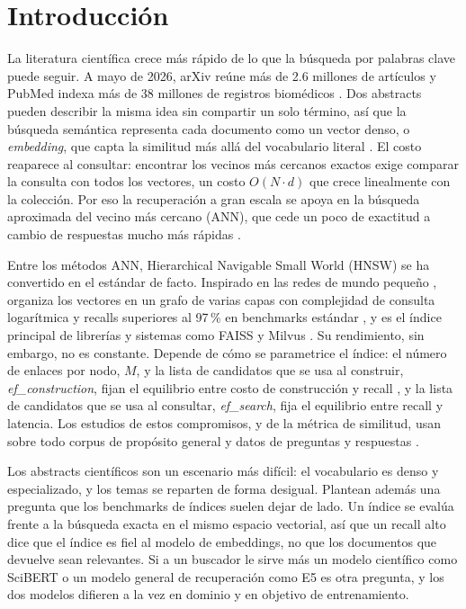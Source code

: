 \documentclass[runningheads]{llncs}
\newcommand{\efc}{\textit{ef\_construction}}
\newcommand{\efs}{\textit{ef\_search}}
\begin{document}
\section{Introducción}

La literatura científica crece más rápido de lo que la búsqueda por palabras clave puede
seguir. A mayo de 2026, arXiv reúne más de 2.6 millones de artículos \cite{ref1} y PubMed
indexa más de 38 millones de registros biomédicos \cite{ref2}. Dos abstracts pueden
describir la misma idea sin compartir un solo término, así que la búsqueda semántica
representa cada documento como un vector denso, o \textit{embedding}, que capta la similitud
más allá del vocabulario literal \cite{ref3}. El costo reaparece al consultar: encontrar los
vecinos más cercanos exactos exige comparar la consulta con todos los vectores, un costo
$O(N \cdot d)$ que crece linealmente con la colección. Por eso la recuperación a gran escala
se apoya en la búsqueda aproximada del vecino más cercano (ANN), que cede un poco de exactitud
a cambio de respuestas mucho más rápidas \cite{ref4}.

Entre los métodos ANN, Hierarchical Navigable Small World (HNSW) \cite{ref5} se ha
convertido en el estándar de facto. Inspirado en las redes de mundo pequeño \cite{ref6},
organiza los vectores en un grafo de varias capas con complejidad de consulta logarítmica y
recalls superiores al 97\,\% en benchmarks estándar \cite{ref5}, y es el índice principal de
librerías y sistemas como FAISS \cite{ref7} y Milvus \cite{ref8}. Su rendimiento, sin
embargo, no es constante. Depende de cómo se parametrice el índice: el número de enlaces por
nodo, $M$, y la lista de candidatos que se usa al construir, \efc{}, fijan el equilibrio entre
costo de construcción y recall \cite{ref9}, y la lista de candidatos que se usa al consultar,
\efs{}, fija el equilibrio entre recall y latencia. Los estudios de estos compromisos, y de la
métrica de similitud, usan sobre todo corpus de propósito general y datos de preguntas y
respuestas \cite{ref11,ref12}.

Los abstracts científicos son un escenario más difícil: el vocabulario es denso y
especializado, y los temas se reparten de forma desigual. Plantean además una pregunta que
los benchmarks de índices suelen dejar de lado. Un índice se evalúa frente a la búsqueda
exacta en el mismo espacio vectorial, así que un recall alto dice que el índice es fiel al
modelo de embeddings, no que los documentos que devuelve sean relevantes. Si a un buscador le
sirve más un modelo científico como SciBERT \cite{ref18} o un modelo general de recuperación
como E5 \cite{ref19} es otra pregunta, y los dos modelos difieren a la vez en dominio y en
objetivo de entrenamiento.
\end{document}
